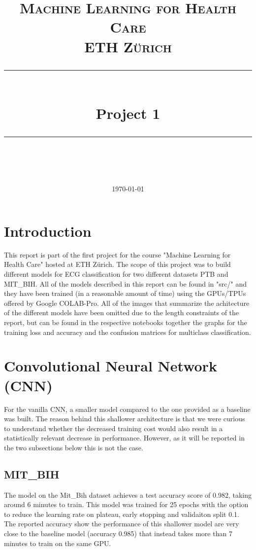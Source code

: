 \documentclass[11pt]{scrartcl}
\title{	
	\normalfont\normalsize
	\textsc{Machine Learning for Health Care\\%
	ETH Zürich}\\
	\vspace{25pt}
	\rule{\linewidth}{0.5pt}\\
	\vspace{20pt}
	{\huge Project 1}\\
	\vspace{12pt}
	\rule{\linewidth}{1pt}\\
	\vspace{12pt}
}
\author{\LARGE \thestudent}
\date{\normalsize\today}
\begin{document}
\maketitle
\newpage
\tableofcontents
\newpage



\section{Introduction}
This report is part of the first project for the course "Machine Learning for Health Care" hosted at ETH Zürich. The scope of this project was to build different models for ECG classification for two different datasets PTB and MIT\_BIH.  All of the models described in this report can be found in  "src/" and they have been trained (in a reasonable amount of time) using the GPUs/TPUs offered by Google COLAB-Pro. All of the images that summarize the achitecture of the different models have been omitted due to the length constraints of the report, but can be found in the respective notebooks together the graphs for the training loss and accuracy and the confusion matrices for multiclass classification.


\section{Convolutional Neural Network (CNN)}
For the vanilla CNN, a smaller model compared to the one provided as a baseline was built. The reason behind this shallower architecture is that we were curious to understand whether the decreased training cost would also result in a statistically relevant decrease in performance. However, as it will be reported in the two subsections below this is not the case. 

\subsection{MIT\_BIH}
The model on the Mit\_Bih dataset achieves a test accuracy score of 0.982, taking around 6 minutes to train. This model was trained for 25 epochs with the option to reduce the learning rate on plateau, early stopping and validaiton split 0.1.
The reported accuracy show the performance of this shallower model are very close to the baseline model (accuracy 0.985)  that instead takes more than 7 minutes to train on the same GPU.
\end{document}
